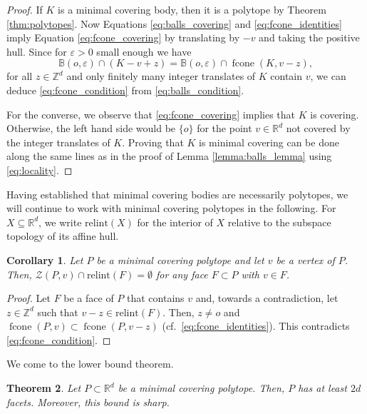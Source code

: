 \documentclass[11pt, a4paper]{amsart}
\newcommand{\orbit}{\mathcal{Z}}
\newcommand{\RR}{\mathbb{R}}
\newcommand{\ZZ}{\mathbb{Z}}
\newcommand{\relint}{\mathrm{relint}}
\newcommand{\ball}{\mathbb{B}}
\DeclareMathOperator{\fcone}{fcone}
\newcommand{\origin}{o}
\numberwithin{equation}{section}
\theoremstyle{plain}
\newtheorem{theorem}{Theorem}[section]
\newtheorem{corollary}[theorem]{Corollary}
\begin{document}
\begin{proof}
If $K$ is a minimal covering body, then it is a polytope by Theorem \ref{thm:polytopes}. Now Equations \eqref{eq:balls_covering} and \eqref{eq:fcone_identities} imply Equation \eqref{eq:fcone_covering} by translating by $-v$ and taking the positive hull. Since for $\varepsilon>0$ small enough we have 
\begin{equation}
\label{eq:locality}
\ball(\origin,\varepsilon) \cap (K - v + z) = \ball(\origin,\varepsilon)\cap \fcone(K,v-z),
\end{equation}
 for all $z\in\ZZ^d$ and only finitely many integer translates of $K$ contain $v$, we can deduce \eqref{eq:fcone_condition} from \eqref{eq:balls_condition}.

For the converse, we observe that \eqref{eq:fcone_covering} implies that $K$ is covering. Otherwise, the left hand side would be $\{\origin\}$ for the point $v\in\RR^d$ not covered by the integer translates of $K$. Proving that $K$ is minimal covering can be done along the same lines as in the proof of Lemma \ref{lemma:balls_lemma} using \eqref{eq:locality}.
\end{proof}


Having established that minimal covering bodies are necessarily polytopes, we will continue to work with minimal covering polytopes in the following. For $X\subseteq\RR^d$, we write $\relint(X)$ for the interior of $X$ relative to the subspace topology of its affine hull.

\begin{corollary}\label{rem: no interior pts}
Let $P$ be a minimal covering polytope and let $v$ be a vertex of $P$. Then, $\orbit(P,v)\cap\relint(F) = \emptyset$ for any face $F\subset P$ with $v\in F$.
\end{corollary}

\begin{proof}
Let $F$ be a face of $P$ that contains $v$ and, towards a contradiction, let $z\in\ZZ^d$ such that $v-z\in \relint(F)$. Then, $z\neq \origin$ and $\fcone(P,v) \subset \fcone(P,v-z)$ (cf.\ \eqref{eq:fcone_identities}). This contradicts \eqref{eq:fcone_condition}.
\end{proof}

We come to the lower bound theorem.

\begin{theorem}
\label{thm:lower_bound}
Let $P\subset\RR^d$ be a minimal covering polytope. Then, $P$ has at least $2d$ facets. Moreover, this bound is sharp.
\end{theorem}
\end{document}
